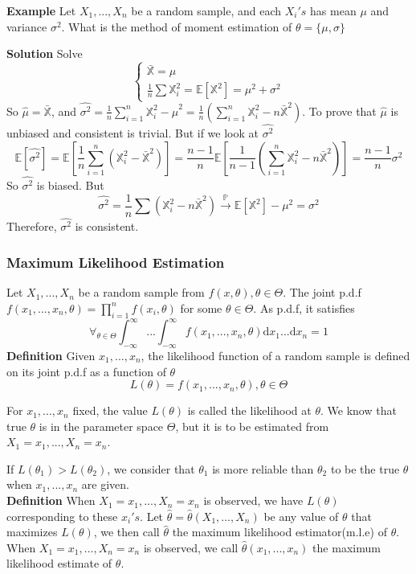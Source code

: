 \documentclass[a4paper,12pt]{article}
\begin{document}
\textbf{Example} Let $X_1, ..., X_n$ be a random sample, and each $X_i's$ has mean $\mu$ and variance $\sigma^2$. What is the method of moment estimation of $\theta = \{\mu, \sigma\}$

\textbf{Solution} Solve
$$\begin{cases}
\bar{\mathbb{X}} = \mu \\
\frac{1}{n}\sum \mathbb{X}_i^2 = \mathbb{E}[\mathbb{X}^2] = \mu^2 + \sigma^2
\end{cases}$$
So $\hat{\mu} = \bar{\mathbb{X}}$, and $\hat{\sigma^2} = \frac{1}{n}\sum_{i=1}^n \mathbb{X}_i^2 - \hat{\mu}^2 = \frac{1}{n} (\sum_{i=1}^n \mathbb{X}_i^2 - n\bar{\mathbb{X}}^2)$. To prove that $\hat{\mu}$ is unbiased and consistent is trivial. But if we look at $\hat{\sigma^2}$ 
$$\mathbb{E}[\hat{\sigma^2}] = \mathbb{E}[ \frac{1}{n} \sum_{i=1}^n (\mathbb{X}_i^2 - \bar{\mathbb{X}}^2) ] = \frac{n-1}{n}\mathbb{E}[ \frac{1}{n-1} (\sum_{i=1}^n \mathbb{X}_i^2 - n\bar{\mathbb{X}}^2) ] = \frac{n-1}{n} \sigma^2$$
So $\hat{\sigma^2}$ is biased. But
$$\hat{\sigma^2} = \frac{1}{n} \sum (\mathbb{X}_i^2 - n\bar{\mathbb{X}}^2) \overset{\mathbb{P}}{\to} \mathbb{E}[\mathbb{X}^2] - \mu^2 = \sigma^2$$ Therefore, $\hat{\sigma^2}$ is consistent.

\subsubsection{Maximum Likelihood Estimation}

Let $X_1, ..., X_n$ be a random sample from $f(x, \theta), \theta \in \Theta$. The joint p.d.f $f(x_1, ..., x_n, \theta) = \prod_{i=1}^n f(x_i, \theta)$ for some $\theta \in \Theta$. As p.d.f, it satisfies
$$\forall_{\theta \in \Theta }\int_{-\infty}^\infty ... \int_{-\infty}^\infty f(x_1, ..., x_n, \theta) \mathrm{d}x_1 ... \mathrm{d}x_n = 1$$
\textbf{Definition} Given $x_1, ..., x_n$, the likelihood function of a random sample is defined on its joint p.d.f as a function of $\theta$
$$L(\theta) = f(x_1, ..., x_n, \theta), \theta \in \Theta$$

For $x_1, ..., x_n$ fixed, the value $L(\theta)$ is called the likelihood at $\theta$. We know that true $\theta$ is in the parameter space $\Theta$, but it is to be estimated from $X_1 = x_1, ..., X_n = x_n$.

If $L(\theta_1) > L(\theta_2)$, we consider that $\theta_1$ is more reliable than $\theta_2$ to be the true $\theta$ when $x_1, ..., x_n$ are given.\\

\textbf{Definition} When $X_1 = x_1, ..., X_n = x_n$ is observed, we have $L(\theta)$ corresponding to these $x_i's$. Let $\hat{\theta} = \hat{\theta}(X_1, ..., X_n)$ be any value of $\theta$ that maximizes $L(\theta)$, we then call $\hat{\theta}$ the maximum likelihood estimator(m.l.e) of $\theta$. When $X_1 = x_1, ..., X_n = x_n$ is observed, we call $\hat{\theta}(x_1, ..., x_n)$ the maximum likelihood estimate of $\theta$.
\end{document}

